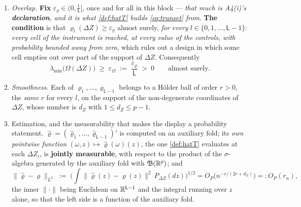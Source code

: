 \begin{assumption}\label{ass:overlap}~
\begin{enumerate}
\item[(i)] \emph{Overlap.} \textbf{Fix} $\varepsilon_\varrho\in\big(0,\tfrac1{\mathsf L}\big]$, once and
for all in this block --- \emph{that much is A4(i)'s \textbf{declaration}, and it is what
\cref{def:hatT} builds \eqref{eq:trunset} from}. \textbf{The condition} is that
$\varrho_l(\Delta Z)\ge\varepsilon_\varrho$ almost surely, \emph{for every}
$l\in\{0,1,\dots,\mathsf L-1\}$: \emph{every cell of the instrument is reached, at every value of the
controls, with probability bounded away from zero}, which rules out a design in which some cell empties
out over part of the support of $\Delta Z$. Consequently
\begin{equation}\label{eq:omegafloor}
\lambda_{\min}\big(\Omega(\Delta Z)\big)\;\ge\;\varepsilon_\Omega\;:=\;\frac{\varepsilon_\varrho}{\mathsf L}\;>\;0
\qquad\text{almost surely.}
\end{equation}
\item[(ii)] \emph{Smoothness.} Each of $\varrho_1,\dots,\varrho_{\mathsf L-1}$ belongs to a H\"older ball
of order $r>0$, the \emph{same} $r$ for every $l$, on the support of the
non-degenerate coordinates of $\Delta Z$, whose number is $d_Z$ with $1\le d_Z\le p-1$.
\item[(iii)] Estimation, and the measurability that makes the display a probability statement.
$\hat\varrho=(\hat\varrho_1,\dots,\hat\varrho_{\mathsf L-1})'$ is computed on an auxiliary fold; its
\emph{own pointwise function}
$(\omega,z)\mapsto\hat\varrho(\omega)(z)$, the one \cref{def:hatT} evaluates at each $\Delta Z_i$, is
\textbf{jointly measurable}, with respect to the product of the $\sigma$-algebra generated by the
auxiliary fold with $\mathfrak B(\mathbb{R}^{p})$; and
\[
\big\|\hat\varrho-\varrho\big\|_{L^2}
\;:=\;\Big(\int\big\|\hat\varrho(z)-\varrho(z)\big\|^{2}\,P_{\Delta Z}(dz)\Big)^{1/2}
=O_P\big(n^{-r/(2r+d_Z)}\big)=:O_P(r_n),
\]
the inner $\|\cdot\|$ being Euclidean on $\mathbb{R}^{\mathsf L-1}$ and the integral running over $z$ alone, so
that the left side is a function of the auxiliary fold.
\end{enumerate}
\end{assumption}

